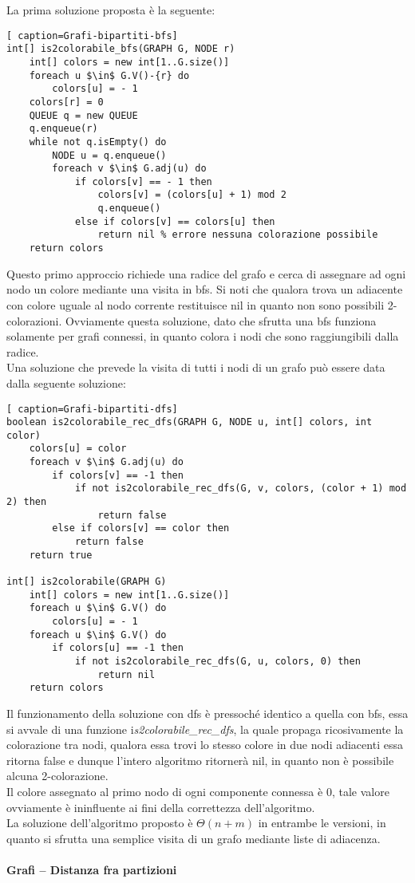 \documentclass[../cheatSheetAlgoritmi.tex]{subfiles}
\begin{document}
La prima soluzione proposta è la seguente:
\begin{lstlisting}[ caption=Grafi-bipartiti-bfs]
int[] is2colorabile_bfs(GRAPH G, NODE r)
	int[] colors = new int[1..G.size()]
  	foreach u $\in$ G.V()-{r} do
    	colors[u] = - 1
  	colors[r] = 0
  	QUEUE q = new QUEUE
  	q.enqueue(r)
  	while not q.isEmpty() do
    	NODE u = q.enqueue()
    	foreach v $\in$ G.adj(u) do
      		if colors[v] == - 1 then
        		colors[v] = (colors[u] + 1) mod 2
        		q.enqueue()
      		else if colors[v] == colors[u] then
        		return nil % errore nessuna colorazione possibile
  	return colors
\end{lstlisting}
Questo primo approccio richiede una radice del grafo e cerca di assegnare ad ogni nodo un colore mediante una visita in bfs. Si noti che qualora trova un adiacente con colore uguale al nodo corrente restituisce nil in quanto non sono possibili 2-colorazioni. Ovviamente questa soluzione, dato che sfrutta una bfs funziona solamente per grafi connessi, in quanto colora i nodi che sono raggiungibili dalla radice.\\
Una soluzione che prevede la visita di tutti i nodi di un grafo può essere data dalla seguente soluzione:
\newpage
\begin{lstlisting}[ caption=Grafi-bipartiti-dfs]
boolean is2colorabile_rec_dfs(GRAPH G, NODE u, int[] colors, int color)
	colors[u] = color
  	foreach v $\in$ G.adj(u) do
    	if colors[v] == -1 then
      		if not is2colorabile_rec_dfs(G, v, colors, (color + 1) mod 2) then
        		return false
    	else if colors[v] == color then
      		return false
  	return true

int[] is2colorabile(GRAPH G)
 	int[] colors = new int[1..G.size()]
  	foreach u $\in$ G.V() do
    	colors[u] = - 1
  	foreach u $\in$ G.V() do
    	if colors[u] == -1 then 
      		if not is2colorabile_rec_dfs(G, u, colors, 0) then
        		return nil
  	return colors
\end{lstlisting}
Il funzionamento della soluzione con dfs è pressoché identico a quella con bfs, essa si avvale di una funzione i\textit{s2colorabile\_rec\_dfs}, la quale propaga ricosivamente la colorazione tra nodi, qualora essa trovi lo stesso colore in due nodi adiacenti essa ritorna false e dunque l'intero algoritmo ritornerà nil, in quanto non è possibile alcuna 2-colorazione. \\ Il colore assegnato al primo nodo di ogni componente connessa è 0, tale valore ovviamente è ininfluente ai fini della correttezza dell'algoritmo. \\
La soluzione dell'algoritmo proposto è $\Theta(n + m)$ in entrambe le versioni, in quanto si sfrutta una semplice visita di un grafo mediante liste di adiacenza. \\\\
\textbf{Grafi – Distanza fra partizioni}\\
\end{document}
